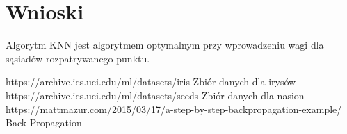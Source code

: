 \documentclass{classrep}
\begin{document}
\section{Wnioski}
Algorytm KNN jest algorytmem optymalnym przy wprowadzeniu wagi dla sąsiadów rozpatrywanego punktu.

\begin{thebibliography}{0}
https://archive.ics.uci.edu/ml/datasets/iris
Zbiór danych dla irysów
https://archive.ics.uci.edu/ml/datasets/seeds
Zbiór danych dla nasion
https://mattmazur.com/2015/03/17/a-step-by-step-backpropagation-example/
Back Propagation
\end{thebibliography}
\end{document}
